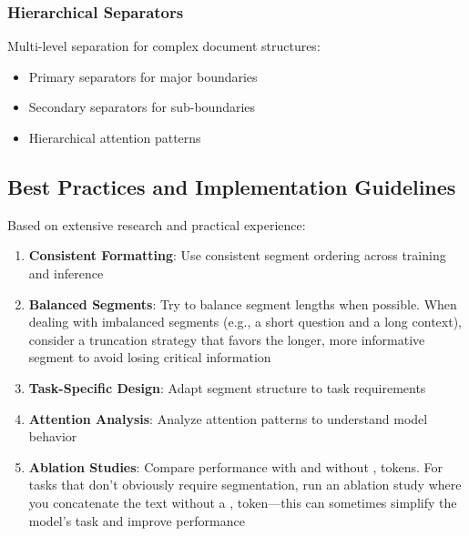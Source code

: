 \subsubsection{Hierarchical Separators}
Multi-level separation for complex document structures:
\begin{itemize}
\item Primary separators for major boundaries
\item Secondary separators for sub-boundaries
\item Hierarchical attention patterns
\end{itemize}

\subsection{Best Practices and Implementation Guidelines}

Based on extensive research and practical experience:

\begin{principle}
\begin{enumerate}
\item \textbf{Consistent Formatting}: Use consistent segment ordering across training and inference
\item \textbf{Balanced Segments}: Try to balance segment lengths when possible. When dealing with imbalanced segments (e.g., a short question and a long context), consider a truncation strategy that favors the longer, more informative segment to avoid losing critical information
\item \textbf{Task-Specific Design}: Adapt segment structure to task requirements
\item \textbf{Attention Analysis}: Analyze attention patterns to understand model behavior
\item \textbf{Ablation Studies}: Compare performance with and without \sep{} tokens. For tasks that don't obviously require segmentation, run an ablation study where you concatenate the text without a \sep{} token---this can sometimes simplify the model's task and improve performance
\end{enumerate}
\end{principle}

